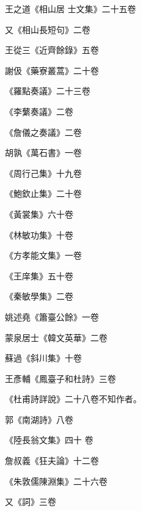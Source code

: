 \begin{pinyinscope}
 王之道《相山居
 士文集》二十五卷



 又《相山長短句》二卷



 王從三《近齊餘錄》五卷



 謝伋《藥寮叢蒿》二十卷



 《羅點奏議》二十三卷



 《李蘩奏議》二卷



 《詹儀之奏議》二卷



 胡孰《萬石書》一卷



 《周行己集》十九卷



 《鮑欽止集》二十卷



 《黃裳集》六十卷



 《林敏功集》十卷



 《方孝能文集》一卷



 《王庠集》五十卷



 《秦敏學集》二卷



 姚述堯《簫臺公餘》一卷



 蒙泉居士《韓文英華》二卷



 蘇過《斜川集》十卷



 王彥輔《鳳臺子和杜詩》三卷



 《杜甫詩詳說》二十八卷不知作者。



 郭《南湖詩》八卷



 《陸長翁文集》四十
 卷



 詹叔義《狂夫論》十二卷



 《朱敦儒陳淵集》二十六卷



 又《詞》三卷




\end{pinyinscope}
